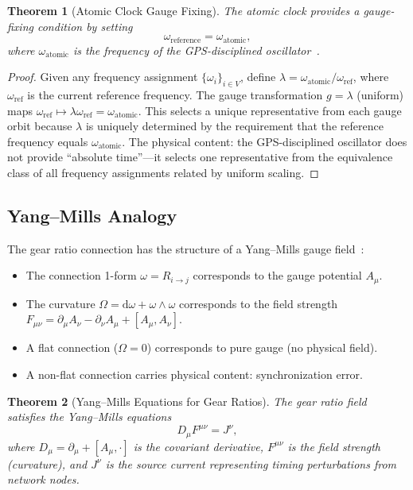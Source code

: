 \documentclass[11pt,twocolumn,a4paper]{article}
\newtheorem{theorem}{Theorem}[section]
\theoremstyle{definition}
\newcommand{\dif}{\mathrm{d}}
\newcommand{\Rij}{R_{i \to j}}
\begin{document}
\begin{theorem}[Atomic Clock Gauge Fixing]\label{thm:atomic_gauge}
The atomic clock provides a gauge-fixing condition by setting
\begin{equation}\label{eq:atomic_gauge}
  \omega_{\mathrm{reference}} = \omega_{\mathrm{atomic}},
\end{equation}
where $\omega_{\mathrm{atomic}}$ is the frequency of the GPS-disciplined
oscillator~\cite{sachikonye2024b}.
\end{theorem}

\begin{proof}
Given any frequency assignment $\{\omega_i\}_{i \in V}$, define
$\lambda = \omega_{\mathrm{atomic}} / \omega_{\mathrm{ref}}$, where $\omega_{\mathrm{ref}}$
is the current reference frequency. The gauge transformation $g = \lambda$ (uniform) maps
$\omega_{\mathrm{ref}} \mapsto \lambda \omega_{\mathrm{ref}} = \omega_{\mathrm{atomic}}$.
This selects a unique representative from each gauge orbit because $\lambda$ is uniquely
determined by the requirement that the reference frequency equals
$\omega_{\mathrm{atomic}}$. The physical content: the GPS-disciplined oscillator does not
provide ``absolute time''---it selects one representative from the equivalence class of
all frequency assignments related by uniform scaling.
\end{proof}

\subsection{Yang--Mills Analogy}\label{sec:gauge:yangmills}

The gear ratio connection has the structure of a Yang--Mills gauge field~\cite{yangmills1954}:

\begin{itemize}
  \item The connection 1-form $\omega = \Rij$ corresponds to the gauge potential $A_\mu$.
  \item The curvature $\Omega = \dif\omega + \omega \wedge \omega$ corresponds to the
        field strength $F_{\mu\nu} = \partial_\mu A_\nu - \partial_\nu A_\mu + [A_\mu, A_\nu]$.
  \item A flat connection ($\Omega = 0$) corresponds to pure gauge (no physical field).
  \item A non-flat connection carries physical content: synchronization error.
\end{itemize}

\begin{theorem}[Yang--Mills Equations for Gear Ratios]\label{thm:yangmills}
The gear ratio field satisfies the Yang--Mills equations
\begin{equation}\label{eq:yangmills}
  D_\mu F^{\mu\nu} = J^\nu,
\end{equation}
where $D_\mu = \partial_\mu + [A_\mu, \cdot]$ is the covariant derivative, $F^{\mu\nu}$
is the field strength (curvature), and $J^\nu$ is the source current representing
timing perturbations from network nodes.
\end{theorem}
\end{document}
